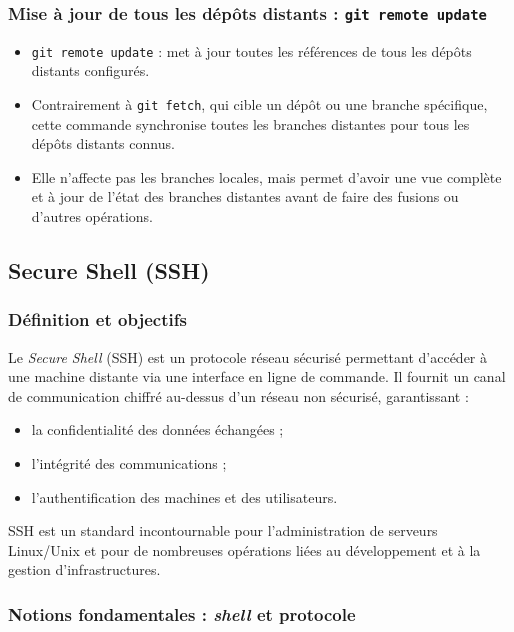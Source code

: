 \documentclass{article}
\begin{document}
\subsubsection{Mise à jour de tous les dépôts distants : \texttt{git remote update}}

\begin{itemize}
    \item \texttt{git remote update} : met à jour toutes les références de tous les dépôts distants configurés.  
    \item Contrairement à \texttt{git fetch}, qui cible un dépôt ou une branche spécifique, cette commande synchronise toutes les branches distantes pour tous les dépôts distants connus.  
    \item Elle n’affecte pas les branches locales, mais permet d’avoir une vue complète et à jour de l’état des branches distantes avant de faire des fusions ou d’autres opérations.
\end{itemize}



\subsection{Secure Shell (SSH)}

\subsubsection{Définition et objectifs}

Le \emph{Secure Shell} (SSH) est un protocole réseau sécurisé permettant d’accéder à une machine distante via une interface en ligne de commande.  
Il fournit un canal de communication chiffré au-dessus d’un réseau non sécurisé, garantissant :
\begin{itemize}
    \item la confidentialité des données échangées ;
    \item l’intégrité des communications ;
    \item l’authentification des machines et des utilisateurs.
\end{itemize}

SSH est un standard incontournable pour l’administration de serveurs Linux/Unix et pour de nombreuses opérations liées au développement et à la gestion d’infrastructures.

\subsubsection{Notions fondamentales : \emph{shell} et protocole}
\end{document}
